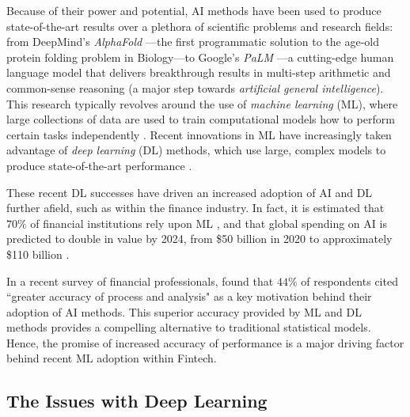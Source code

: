 \documentclass[a4paper, 11pt]{report}
\begin{document}
    Because of their power and potential, AI methods have been used to produce state-of-the-art results over a plethora of scientific problems and research fields: from DeepMind's \emph{AlphaFold} \citep{jumper-2021}---the first programmatic solution to the age-old protein folding problem in Biology---to Google's \emph{PaLM} \citep{chowdhery-2022}---a cutting-edge human language model that delivers breakthrough results in multi-step arithmetic and common-sense reasoning (a major step towards \emph{artificial general intelligence}). This research typically revolves around the use of \emph{machine learning} (ML), where large collections of data are used to train computational models how to perform certain tasks independently \citep{samuel-1959}. Recent innovations in ML have increasingly taken advantage of \emph{deep learning} (DL) methods, which use large, complex models to produce state-of-the-art performance \citep{witten-2017}.

    These recent DL successes have driven an increased adoption of AI and DL further afield, such as within the finance industry. In fact, it is estimated that $70\%$ of financial institutions rely upon ML \citep{gokhale-2019}, and that global spending on AI is predicted to double in value by 2024, from \$50 billion in 2020 to approximately \$110 billion \citep{oecd-2021}.

    In a recent survey of financial professionals, \citet{chartis-2019} found that $44\%$ of respondents cited ``greater accuracy of process and analysis" as a key motivation behind their adoption of AI methods. This superior accuracy provided by ML and DL methods provides a compelling alternative to traditional statistical models. Hence, the promise of increased accuracy of performance is a major driving factor behind recent ML adoption within Fintech.


    \subsection{The Issues with Deep Learning}
\end{document}
